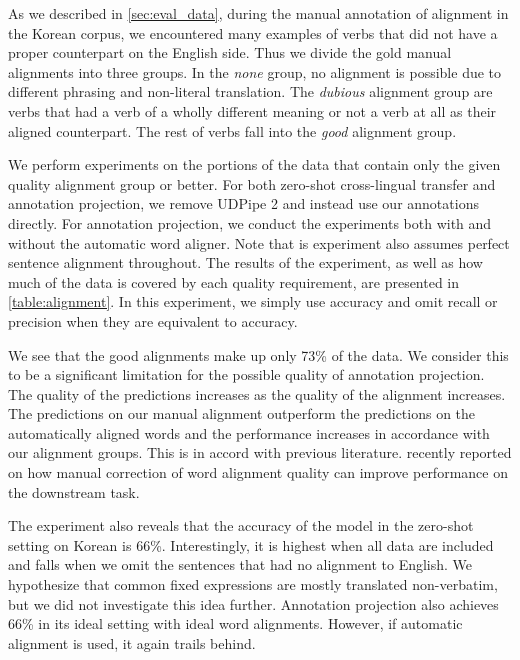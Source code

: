 As we described in \cref{sec:eval_data}, during the manual annotation of alignment in the Korean corpus, we encountered many examples of verbs that did not have a proper counterpart on the English side. Thus we divide the gold manual alignments into three groups. In the \textit{none} group, no alignment is possible due to different phrasing and non-literal translation. The \textit{dubious} alignment group are verbs that had a verb of a wholly different meaning or not a verb at all as their aligned counterpart. The rest of verbs fall into the \textit{good} alignment group.

We perform experiments on the portions of the data that contain only the given quality alignment group or better. For both zero-shot cross-lingual transfer and annotation projection, we remove UDPipe 2 and instead use our annotations directly. For annotation projection, we conduct the experiments both with and without the automatic word aligner. Note that is experiment also assumes perfect sentence alignment throughout. The results of the experiment, as well as how much of the data is covered by each quality requirement, are presented in \cref{table:alignment}. In this experiment, we simply use accuracy and omit recall or precision when they are equivalent to accuracy.

We see that the good alignments make up only 73\% of the data. We consider this to be a significant limitation for the possible quality of annotation projection. The quality of the predictions increases as the quality of the alignment increases. The predictions on our manual alignment outperform the predictions on the automatically aligned words and the performance increases in accordance with our alignment groups. This is in accord with previous literature. \citet{behzad2023effect} recently reported on how manual correction of word alignment quality can improve performance on the downstream task.

The experiment also reveals that the accuracy of the model in the zero-shot setting on Korean is 66\%. Interestingly, it is highest when all data are included and falls when we omit the sentences that had no alignment to English. We hypothesize that common fixed expressions are mostly translated non-verbatim, but we did not investigate this idea further. Annotation projection also achieves 66\% in its ideal setting with ideal word alignments. However, if automatic alignment is used, it again trails behind.  




